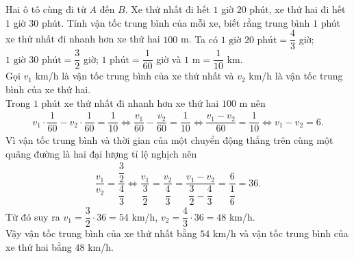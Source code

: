 \begin{bt}%
 Hai ô tô cùng đi từ $A$ đến $B$. Xe thứ nhất đi hết $1$ giờ $20$ phút, xe thứ hai đi hết $1$ giờ $30$ phút. Tính vận tốc trung bình của mỗi xe, biết rằng trung bình $1$ phút xe thứ nhất đi nhanh hơn xe thứ hai $100$ m.
 \loigiai
  {
  Ta có $1 \text{ giờ } 20 \text{ phút} = \dfrac{4}{3}$ giờ; $1 \text{ giờ } 30 \text{ phút} = \dfrac{3}{2}$ giờ; $1 \text{ phút} =\dfrac{1}{60}$ giờ và $1 \text{ m}=\dfrac{1}{10}$ km.\\
  Gọi $v_1$ km/h là vận tốc trung bình của xe thứ nhất và $v_2$ km/h là vận tốc trung bình của xe thứ hai.\\
  Trong  $1$ phút xe thứ nhất đi nhanh hơn xe thứ hai $100$ m nên
  \begin{eqnarray*}
   v_1 \cdot \dfrac{1}{60} - v_2 \cdot \dfrac{1}{60} = \dfrac{1}{10} \Leftrightarrow \dfrac{v_1}{60} - \dfrac{v_2}{60} = \dfrac{1}{10} \Leftrightarrow \dfrac{v_1-v_2}{60} = \dfrac{1}{10} \Leftrightarrow v_1-v_2=6.
  \end{eqnarray*}
  Vì vận tốc trung bình và thời gian của một chuyển động thẳng trên cùng một quãng đường là hai đại lượng tỉ lệ nghịch nên
  \begin{eqnarray*}
   \dfrac{v_1}{v_2} = \dfrac{\dfrac{3}{2}}{\dfrac{4}{3}} \Leftrightarrow \dfrac{v_1}{\dfrac{3}{2}} = \dfrac{v_2}{\dfrac{4}{3}} = \dfrac{v_1-v_2}{\dfrac{3}{2} - \dfrac{4}{3}} = \dfrac{6}{\dfrac{1}{6}} = 36.
  \end{eqnarray*}
  Từ đó suy ra $v_1=\dfrac{3}{2} \cdot 36 = 54$ km/h, $v_2=\dfrac{4}{3} \cdot 36=48$ km/h.\\
  Vậy vận tốc trung bình của xe thứ nhất bằng $54$ km/h và vận tốc trung bình của xe thứ hai bằng $48$ km/h.
  }
\end{bt}

